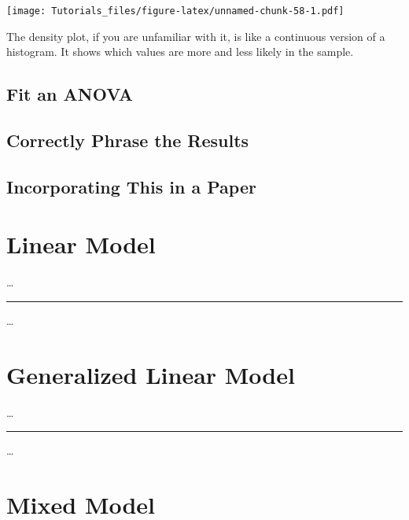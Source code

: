 \documentclass[
]{book}
\begin{document}
\texttt{[image: Tutorials\_files/figure-latex/unnamed-chunk-58-1.pdf]}

The density plot, if you are unfamiliar with it, is like a continuous version of a histogram. It shows which values are more and less likely in the sample.

\hypertarget{fit-an-anova}{%
\section{Fit an ANOVA}\label{fit-an-anova}}

\hypertarget{results-ANOVA}{%
\section{Correctly Phrase the Results}\label{results-ANOVA}}

\hypertarget{incorporating-this-in-a-paper-2}{%
\section{Incorporating This in a Paper}\label{incorporating-this-in-a-paper-2}}

\hypertarget{linear-model}{%
\chapter{Linear Model}\label{linear-model}}

\ldots{}

\begin{center}\rule{0.5\linewidth}{0.5pt}\end{center}

\ldots{}

\hypertarget{generalized-linear-model}{%
\chapter{Generalized Linear Model}\label{generalized-linear-model}}

\ldots{}

\begin{center}\rule{0.5\linewidth}{0.5pt}\end{center}

\ldots{}

\hypertarget{mixed-model}{%
\chapter{Mixed Model}\label{mixed-model}}
\end{document}
